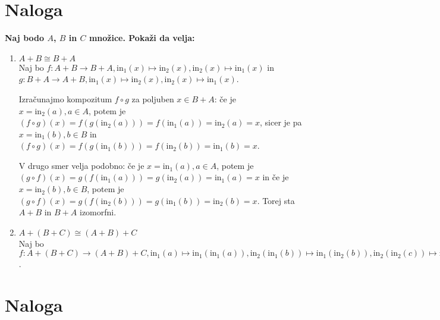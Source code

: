 \documentclass[12pt]{article}
\newcommand{\naloga}{\section{Naloga}}
\newcommand{\inj}[2][\text{}]{\text{in}_{#2}^{#1}}
\begin{document}
\naloga
    \textbf{Naj bodo \(A\), \(B\) in \(C\) množice. Pokaži da  velja:}
    \begin{enumerate}[label=(\alph*)]
        \item \(A + B \cong B + A\) \\
            Naj bo \(f : A + B \rightarrow B + A, \inj{1}(x) \mapsto \inj{2}(x), \inj{2}(x) \mapsto \inj{1}(x)\) in \(g : B + A \rightarrow A + B, \inj{1}(x) \mapsto \inj{2}(x), \inj{2}(x) \mapsto \inj{1}(x)\).

            Izračunajmo kompozitum \(f \circ g\) za poljuben \(x \in B + A\): če je \(x = \inj{2}(a), a \in A\), potem je 
            \(\left(f \circ g\right)(x) = f(g(\inj{2}(a))) = f(\inj{1}(a)) = \inj{2}(a) = x\), sicer je pa \(x = \inj{1}(b), b \in B\) in 
            \(\left(f \circ g\right)(x) = f(g(\inj{1}(b))) = f(\inj{2}(b)) = \inj{1}(b) = x\). 
            
            V drugo smer velja podobno: če je \(x = \inj{1}(a), a \in A\), potem je 
            \(\left(g \circ f\right)(x) = g\left(f\left(\inj{1}(a)\right)\right) = g\left(\inj{2}(a)\right) = \inj{1}(a) = x\) in če je \(x = \inj{2}(b), b \in B\), potem je
            \(\left(g \circ f\right)(x) = g\left(f\left(\inj{2}(b)\right)\right) = g\left(\inj{1}(b)\right) = \inj{2}(b) = x\). Torej sta \(A + B\) in \(B + A\) izomorfni.
        \item \(A + (B + C) \cong (A + B) + C\) \\
            Naj bo \(f : A + (B + C) \rightarrow (A + B) + C, \inj{1}(a) \mapsto \inj{1}(\inj{1}(a)),\allowbreak \inj{2}(\inj{1}(b)) \mapsto \inj{1}(\inj{2}(b)),\allowbreak \inj{2}(\inj{2}(c)) \mapsto \inj{2}(c)\).
    \end{enumerate}

\naloga
\end{document}
